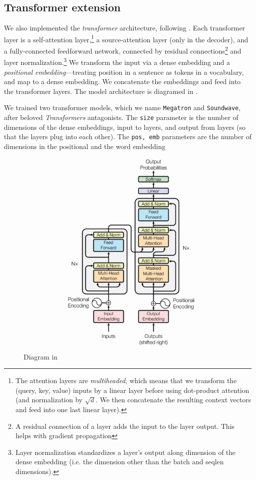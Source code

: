 \documentclass[12pt]{article}
\begin{document}
\subsection{Transformer extension}
We also implemented the \emph{transformer} architecture, following 
\cite{vaswani2017attention}. Each transformer layer is a self-attention
layer,\footnote{The attention layers are \emph{multiheaded}, which means that
we transform the (query, key, value) inputs by a linear layer before using
dot-product attention (and normalization by $\sqrt{d}$. We then concatenate
the resulting context vectors and feed into one last linear layer).} a
source-attention layer (only in the decoder), and a fully-connected feedforward
network, connected by residual connections\footnote{A residual
connection of a layer adds the input to the layer output. This helps with
gradient propagation} and layer normalization.\footnote{Layer normalization
standardizes a layer's output along dimension of the dense embedding (i.e.
the dimension other than the batch and seqlen dimensions).} We
transform
the input via a dense embedding and a \emph{positional embedding}---treating
position in a sentence as tokens in a vocabulary, and map to a dense embedding.
We concatenate the embeddings and feed into the transformer layers. The model
architecture is diagramed in . 

We trained two transformer models, which we name \texttt{Megatron} and 
\texttt{Soundwave}, after beloved \emph{Transformers} antagonists. The 
\texttt{size} parameter is the number of dimensions of the dense embeddings,
input to layers, and output from layers (so that the layers plug into each
other). The \texttt{pos, emb} parameters are the number of dimensions in the
positional and the word embedding 
\begin{figure}[tb]
	\centering
	\includegraphics[width=\textwidth]{figs/transformer.png}
	\caption{Diagram in \cite{vaswani2017attention}}
	\label{fig:transformer}
\end{figure}
\end{document}

